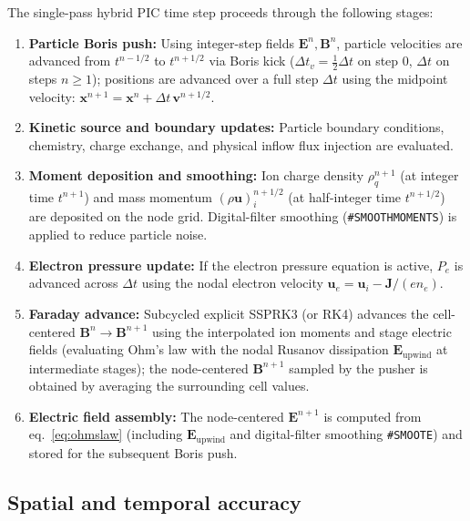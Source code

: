 \documentclass[a4paper, 11pt]{article}
\begin{document}
The single-pass hybrid PIC time step proceeds through the following stages:
\begin{enumerate}
  \item \textbf{Particle Boris push:} Using integer-step fields $\mathbf{E}^n, \mathbf{B}^n$, particle velocities are advanced from $t^{n-1/2}$ to $t^{n+1/2}$ via Boris kick ($\Delta t_v = \tfrac{1}{2}\Delta t$ on step 0, $\Delta t$ on steps $n \ge 1$); positions are advanced over a full step $\Delta t$ using the midpoint velocity: $\mathbf{x}^{n+1} = \mathbf{x}^n + \Delta t\,\mathbf{v}^{n+1/2}$.
  \item \textbf{Kinetic source and boundary updates:} Particle boundary conditions, chemistry, charge exchange, and physical inflow flux injection are evaluated.
  \item \textbf{Moment deposition and smoothing:} Ion charge density $\rho_q^{n+1}$ (at integer time $t^{n+1}$) and mass momentum $(\rho\mathbf{u})_i^{n+1/2}$ (at half-integer time $t^{n+1/2}$) are deposited on the node grid. Digital-filter smoothing (\texttt{\#SMOOTHMOMENTS}) is applied to reduce particle noise.
  \item \textbf{Electron pressure update:} If the electron pressure equation is active, $P_e$ is advanced across $\Delta t$ using the nodal electron velocity $\mathbf{u}_e = \mathbf{u}_i - \mathbf{J}/(e n_e)$.
  \item \textbf{Faraday advance:} Subcycled explicit SSPRK3 (or RK4) advances the cell-centered $\mathbf{B}^n \to \mathbf{B}^{n+1}$ using the interpolated ion moments and stage electric fields (evaluating Ohm's law with the nodal Rusanov dissipation $\mathbf{E}_{\text{upwind}}$ at intermediate stages); the node-centered $\mathbf{B}^{n+1}$ sampled by the pusher is obtained by averaging the surrounding cell values.
  \item \textbf{Electric field assembly:} The node-centered $\mathbf{E}^{n+1}$ is computed from eq.~\eqref{eq:ohmslaw} (including $\mathbf{E}_{\text{upwind}}$ and digital-filter smoothing \texttt{\#SMOOTE}) and stored for the subsequent Boris push.
\end{enumerate}

\subsection{Spatial and temporal accuracy}
\end{document}
